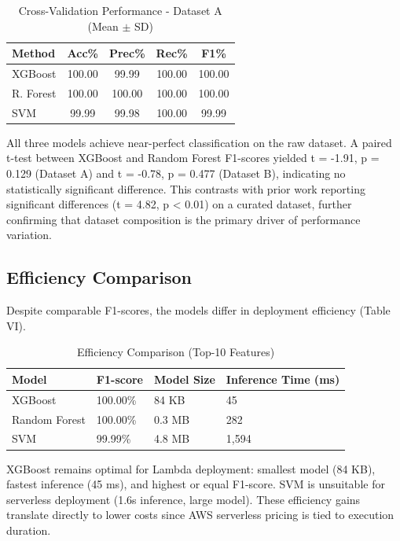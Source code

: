 \documentclass[conference]{IEEEtran}
\begin{document}
\begin{table}[!ht]
\centering
\caption{Cross-Validation Performance - Dataset A (Mean $\pm$ SD)}
\footnotesize
\setlength{\tabcolsep}{2pt}
\begin{tabulary}{\linewidth}{|l|c|c|c|c|}
\hline
\textbf{Method} & \textbf{Acc\%} & \textbf{Prec\%} & \textbf{Rec\%} & \textbf{F1\%} \\
\hline
XGBoost & 100.00 & 99.99 & 100.00 & 100.00 \\
R. Forest & 100.00 & 100.00 & 100.00 & 100.00 \\
SVM & 99.99 & 99.98 & 100.00 & 99.99 \\
\hline
\end{tabulary}
\end{table}

All three models achieve near-perfect classification on the raw dataset. A paired t-test between XGBoost and Random Forest F1-scores yielded t = -1.91, p = 0.129 (Dataset A) and t = -0.78, p = 0.477 (Dataset B), indicating no statistically significant difference. This contrasts with prior work reporting significant differences (t = 4.82, p < 0.01) on a curated dataset, further confirming that dataset composition is the primary driver of performance variation.

\subsection{Efficiency Comparison}

Despite comparable F1-scores, the models differ in deployment efficiency (Table VI).

\begin{table}[!ht]
\centering
\caption{Efficiency Comparison (Top-10 Features)}
\footnotesize
\setlength{\tabcolsep}{3pt}
\begin{tabulary}{\linewidth}{|l|L|L|L|}
\hline
\textbf{Model} & \textbf{F1-score} & \textbf{Model Size} & \textbf{Inference Time (ms)} \\
\hline
XGBoost & 100.00\% & 84 KB & 45 \\
Random Forest & 100.00\% & 0.3 MB & 282 \\
SVM & 99.99\% & 4.8 MB & 1,594 \\
\hline
\end{tabulary}
\end{table}

XGBoost remains optimal for Lambda deployment: smallest model (84 KB), fastest inference (45 ms), and highest or equal F1-score. SVM is unsuitable for serverless deployment (1.6s inference, large model). These efficiency gains translate directly to lower costs since AWS serverless pricing is tied to execution duration.
\end{document}
